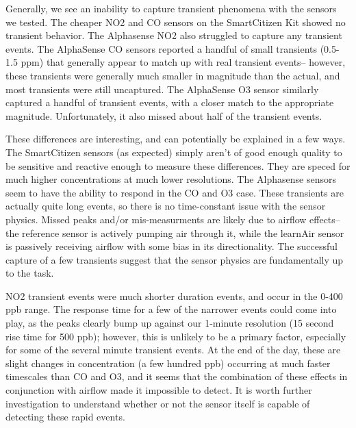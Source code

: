 Generally, we see an inability to capture transient phenomena with the sensors we tested.  The cheaper NO2 and CO sensors on the SmartCitizen Kit showed no transient behavior.  The Alphasense NO2 also struggled to capture any transient events. The AlphaSense CO sensors reported a handful of small transients (0.5-1.5 ppm) that generally appear to match up with real transient events-- however, these transients were generally much smaller in magnitude than the actual, and most transients were still uncaptured.  The AlphaSense O3 sensor similarly captured a handful of transient events, with a closer match to the appropriate magnitude.  Unfortunately, it also missed about half of the transient events.

 These differences are interesting, and can potentially be explained in a few ways.  The SmartCitizen sensors (as expected) simply aren't of good enough quality to be sensitive and reactive enough to measure these differences.  They are speced for much higher concentrations at much lower resolutions.  The Alphasense sensors seem to have the ability to respond in the CO and O3 case.  These transients are actually quite long events, so there is no time-constant issue with the sensor physics.  Missed peaks and/or mis-measurments are likely due to airflow effects-- the reference sensor is actively pumping air through it, while the learnAir sensor is passively receiving airflow with some bias in its directionality.  The successful capture of a few transients suggest that the sensor physics are fundamentally up to the task.
 
NO2 transient events were much shorter duration events, and occur in the 0-400 ppb range.  The response time for a few of the narrower events could come into play, as the peaks clearly bump up against our 1-minute resolution (15 second rise time for 500 ppb); however, this is unlikely to be a primary factor, especially for some of the several minute transient events.  At the end of the day, these are slight changes in concentration (a few hundred ppb) occurring at much faster timescales than CO and O3, and it seems that the combination of these effects in conjunction with airflow made it impossible to detect.  It is worth further investigation to understand whether or not the sensor itself is capable of detecting these rapid events.
 

